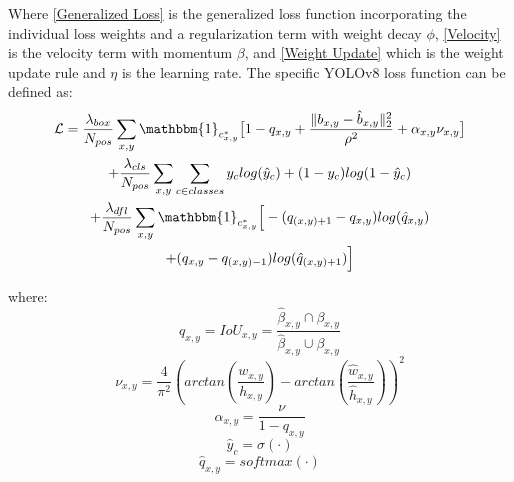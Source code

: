\documentclass[10pt,twocolumn,letterpaper]{article}
\begin{document}
Where \ref{Generalized Loss} is the generalized loss function incorporating the individual loss weights and a regularization term with weight decay $\phi$, \ref{Velocity} is the velocity term with momentum $\beta$, and \ref{Weight Update} which is the weight update rule and $\eta$ is the learning rate. The specific YOLOv8 loss function can be defined as:
\begin{multline}
\mathcal{L} = \dfrac{\lambda_{box}}{N_{pos}}\sum_{x,y}\mathbbm{1}_{c^*_{x,y}}\big[1 - q_{x,y} + \dfrac{\Vert b_{x,y} - \hat{b}_{x,y} \Vert_2^2}{\rho^2} + \alpha_{x,y}\nu_{x,y}\big] \\  + \dfrac{\lambda_{cls}}{N_{pos}}\sum_{x,y}\sum_{c\in classes}y_clog(\hat{y}_c) + (1 - y_c)log(1 - \hat{y}_c) \\
+ \dfrac{\lambda_{dfl}}{N_{pos}}\sum_{x,y}\mathbbm{1}_{c^*_{x,y}}\Big[-(q_{(x,y)+1} - q_{x,y})log(\hat{q}_{x,y}) \\
+ (q_{x,y} - q_{(x,y)-1})log(\hat{q}_{(x,y)+1})\Big]
\end{multline}

where:
\begin{equation*}\label{IoU}
q_{x,y} = IoU_{x,y} = \dfrac{\hat{\beta}_{x,y}\displaystyle \cap\beta_{x,y}}{\hat{\beta}_{x,y}\displaystyle \cup\beta_{x,y}}
\end{equation*}
\begin{equation*}\label{v}
\nu_{x,y} = \dfrac{4}{\pi^2}(arctan(\dfrac{w_{x,y}}{h_{x,y}}) - arctan(\dfrac{\hat{w}_{x,y}}{\hat{h}_{x,y}}))^2
\end{equation*}
\begin{equation*}\label{a}
\alpha_{x,y} = \dfrac{\nu}{1 - q_{x,y}}
\end{equation*}
\begin{equation*}\label{y_hat}
\hat{y}_c = \sigma({\cdot})
\end{equation*}
\begin{equation*}\label{q_hat}
\hat{q}_{x,y} = softmax({\cdot})
\end{equation*}
    
\end{document}
